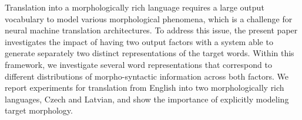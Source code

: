 Translation into a morphologically rich language requires a large output vocabulary to model various morphological phenomena, which is a challenge for neural machine translation architectures. To address this issue, the present paper investigates the impact of having two output factors with a system able to generate separately two distinct representations of the target words. Within this framework, we investigate several word representations that correspond to different distributions of morpho-syntactic information across both factors. We report experiments for translation from English into two morphologically rich languages, Czech and Latvian, and show the importance of explicitly modeling target morphology.
